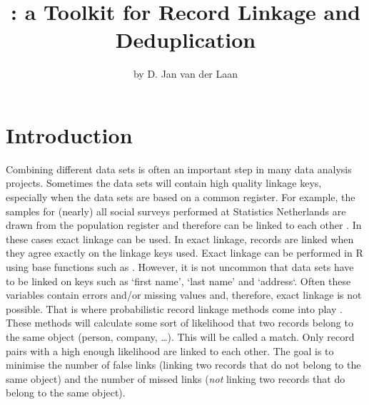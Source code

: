 \title{: a Toolkit for Record Linkage and Deduplication}
\author{by D. Jan van der Laan} 
\maketitle


\section{Introduction}

Combining different data sets is often an important step in many data analysis projects. Sometimes
the data sets will contain high quality linkage keys, especially when the data sets are based on a
common register. For example, the samples for (nearly) all social surveys performed at Statistics
Netherlands are drawn from the population register and therefore can be linked to each other
\citep{ssb}. In these cases exact linkage can be used. In exact linkage, records are linked when
they agree exactly on the linkage keys used. Exact linkage can be performed in R using
base functions such as .  However, it is not uncommon that data sets have to be linked
on keys such as `first name', `last name' and `address`. Often these variables contain errors and/or
missing values and, therefore, exact linkage is not possible. That is where probabilistic record
linkage methods come into play \citep{herzog,datamatching}.  These methods will calculate some sort
of likelihood that two records belong to the same object (person, company, \ldots). This will be
called a match. Only record pairs with a high enough likelihood are linked to each other.  The goal
is to minimise the number of false links (linking two records that do not belong to the same object)
and the number of missed links (\emph{not} linking two records that do belong to the same object).

